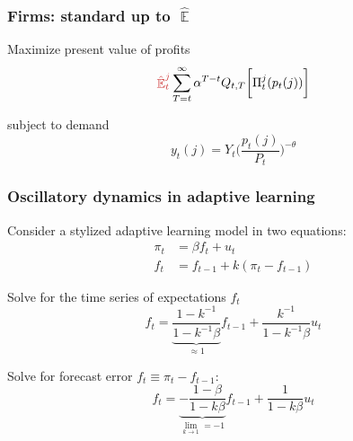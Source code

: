 \documentclass[10pt]{beamer}
\DeclareMathOperator{\E}{\mathbb{E}}
\begin{document}
\begin{frame}[plain]  %
	\frametitle{Firms: standard up to $\hat{\E}$}

Maximize present value of profits
\begin{equation}
\textcolor{brownreddark}{\hat{\E}^j_t}\sum^{\infty}_{T=t}\alpha^{T-t} Q_{t,T} \bigg[ \Pi^j_t(p_t(j))\bigg]
\label{lifetime_profits}
\end{equation}

subject to demand
\begin{equation}
y_t(j) = Y_t \bigg(\frac{p_t(j)}{P_t}\bigg)^{-\theta}
\end{equation}


\vfill 
\hyperlink{model_overview}{}	

\end{frame}




\begin{frame}[plain]  %
\frametitle{Oscillatory dynamics in adaptive learning}
	\label{oscillatory}

Consider a stylized adaptive learning model in two equations:
\begin{align}
\pi_t & = \beta f_t + u_t  \\
f_t & = f_{t-1} + k(\pi_t - f_{t-1}) 
\end{align}

Solve for the time series of expectations $f_t$
\begin{equation}
f_t = \underbrace{\frac{1-k^{-1}}{1-k^{-1}\beta}}_{\approx 1}f_{t-1} + \frac{k^{-1}}{1-k^{-1}\beta}u_t
\end{equation}

Solve for forecast error $f_t \equiv \pi_t - f_{t-1}$:
\begin{equation}
f_t = \underbrace{-\frac{1-\beta}{1-k\beta}}_{\lim_{k \to 1} = -1}f_{t-1} + \frac{1}{1-k\beta}u_t 
\end{equation}

\vfill 
\hyperlink{IRF1}{}	

\end{frame}
\end{document}

